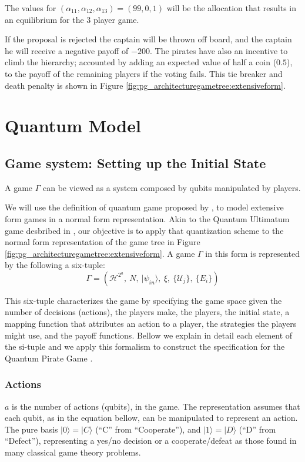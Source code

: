 \documentclass[10pt]{llncs}
\begin{document}
The values for $(\alpha_{11}, \alpha_{12}, \alpha_{13})=(99, 0, 1)$ will be the allocation that results in an equilibrium for the $3$ player game. 


If the proposal is rejected the captain will be thrown off board, and the captain he will receive a negative payoff of $-200$. The pirates have also an incentive to climb the hierarchy; accounted by adding an expected value of half a coin ($0.5$), to the payoff of the remaining players if the voting fails. This tie breaker and death penalty is shown in Figure \ref{fig:pg_architecturegametree:extensiveform}.

\section{Quantum Model}
\subsection{Game system: Setting up the Initial State}
\label{subsec:pirates_initialstate}

A game $\Gamma$ can be viewed as a system composed by qubits manipulated by players. 



We will use the definition of quantum game proposed by \cite{Fra2011a}, to model extensive form games in a normal form representation. Akin to the Quantum Ultimatum game desbribed in \cite{Fra2011}, our objective is to apply that quantization scheme to the normal form representation of the game tree in Figure \ref{fig:pg_architecturegametree:extensiveform}. A game $\Gamma$  in this
form is represented by the following a six-tuple:
\begin{equation}
\Gamma=(\mathcal{H}^{2^{a}},\: N,\:\vert\psi_{in}\rangle,\:\xi,\:\{\mathcal{U}_{j}\},\:\{E_{i}\})\label{eq:quantum_game_six_tuple}
\end{equation}

This six-tuple characterizes the game by specifying the game space given the number of decisions (actions), the players make, the players, the initial state, a mapping function that attributes an action to a player, the strategies the players might use, and the payoff functions. Bellow we explain in detail each element of the si-tuple and we apply this formalism to construct the specification for the Quantum Pirate Game \cite{Fra2011a}.



\subsubsection{Actions} $a$ is the number of actions (qubits), in the game. The representation assumes that each qubit, as in the equation bellow, can be manipulated to represent an action. The pure basis $\vert 0\rangle = \vert C\rangle$ (``C'' from ``Cooperate''), and $\vert 1\rangle = \vert D\rangle$ (``D'' from ``Defect''), representing a yes/no decision or a cooperate/defeat as
those found in many classical game theory problems.
\end{document}
